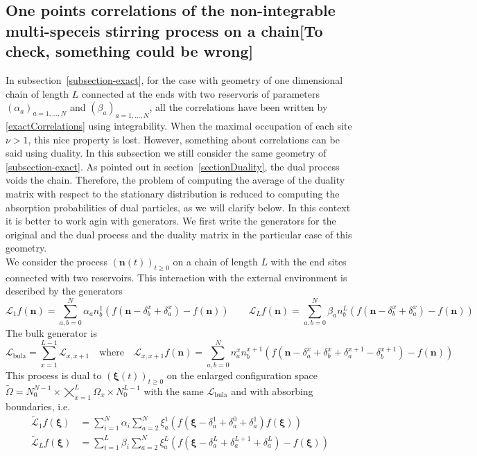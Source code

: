 \documentclass[11pt]{article}
\numberwithin{equation}{section}
\numberwithin{equation}{subsection}
\begin{document}
\subsection{One points correlations of the non-integrable multi-speceis stirring process on a chain[To check, something could be wrong]}
In subsection~\ref{subsection-exact}, for the case with geometry of one dimensional chain of length $L$ connected at the ends with two reservoris of parameters $(\alpha_{a})_{a=1,\ldots,N}$ and $(\beta_{a})_{a=1,\ldots,N}$, all the correlations have been written by \eqref{exactCorrelations} using integrability. When the maximal occupation of each site $\nu>1$, this nice property is lost. However, something about correlations can be said using duality. In this subsection we still consider the same geometry of \ref{subsection-exact}. As pointed out in section~\ref{sectionDuality}, the dual process voids the chain. Therefore, the problem of computing the average of the duality matrix with respect to the stationary distribution is reduced to computing the absorption probabilities of dual particles, as we will clarify below. In this context it is better to work agin with generators. We first write the generators for the original and the dual process and the duality matrix in the particular case of this geometry. \\
We consider the process $(\bm{n}(t))_{t\geq 0}$ on a chain of length $L$ with the end sites connected with two reservoirs. This interaction with the external environment is described by the generators 
\begin{equation}
    \mathcal{L}_{1}f(\bm{n})=\sum_{a,b=0}^{N}\alpha_{a}n_{b}^{1}\left(f(\bm{n}-\delta_{b}^{x}+\delta_{a}^{x})-f(\bm{n})\right)\qquad \mathcal{L}_{L}f(\bm{n})=\sum_{a,b=0}^{N}\beta_{a}n_{b}^{L}\left(f(\bm{n}-\delta_{b}^{x}+\delta_{a}^{x})-f(\bm{n})\right)
\end{equation}
The bulk generator is 
\begin{equation}
    \mathcal{L}_{\text{bula}}=\sum_{x=1}^{L-1}\mathcal{L}_{x,x+1}\quad \text{where}\quad \mathcal{L}_{x,x+1}f(\bm{n})=\sum_{a,b=0}^{N}n_{a}^{x}n_{b}^{x+1}\left(f(\bm{n}-\delta_{a}^{x}+\delta_{b}^{x}+\delta_{a}^{x+1}-\delta_{b}^{x+1})-f(\bm{n})\right)
\end{equation}
This process is dual to $(\bm{\xi}(t))_{t\geq0} $ on the enlarged configuration space $\widetilde{\Omega}=N_{0}^{N-1}\times\bigtimes_{x=1}^{L} \Omega_{x}\times N_{0}^{L-1}$ with the same $\mathcal{L}_{\text{bula}}$ and with absorbing boundaries, i.e. 
\begin{equation}
\begin{split}
        \widetilde{\mathcal{L}}_{1}f(\bm{\xi})&=\sum_{i=1}^{N}\alpha_{i}\sum_{a=2}^{N}\xi_{a}^{1}\left(f(\bm{\xi}-\delta_{a}^{1}+\delta_{a}^{0}+\delta_{a}^{1})f(\bm{\xi})\right)\\\widetilde{\mathcal{L}}_{L}f(\bm{\xi})&=\sum_{i=1}^{L}\beta_{i}\sum_{a=2}^{N}\xi_{a}^{L}\left(f(\bm{\xi}-\delta_{a}^{L}+\delta_{a}^{L+1}+\delta_{a}^{L})-f(\bm{\xi})\right)
        \end{split}
\end{equation}
\end{document}
